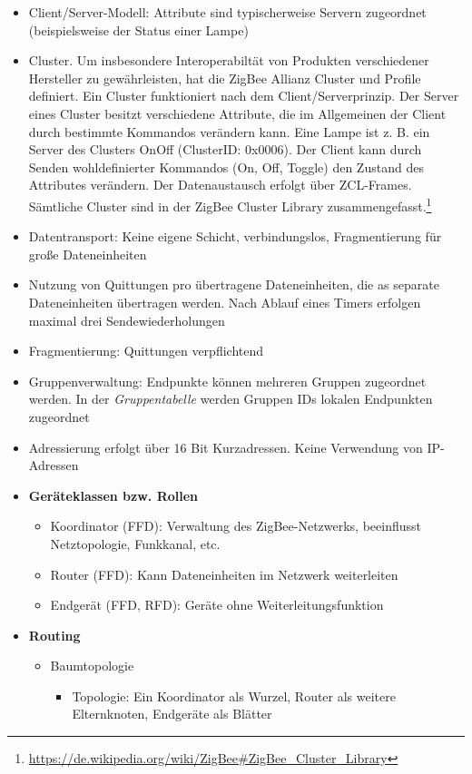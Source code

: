 \begin{itemize}
\begin{itemize}
	\end{itemize}
	\item Client/Server-Modell: Attribute sind typischerweise Servern zugeordnet (beispielsweise der Status einer Lampe)
	\item Cluster. Um insbesondere Interoperabiltät von Produkten verschiedener Hersteller zu gewährleisten, hat die ZigBee Allianz Cluster und Profile definiert. Ein Cluster funktioniert nach dem Client/Serverprinzip. Der Server eines Cluster besitzt verschiedene Attribute, die im Allgemeinen der Client durch bestimmte Kommandos verändern kann. Eine Lampe ist z. B. ein Server des Clusters OnOff (ClusterID: 0x0006). Der Client kann durch Senden wohldefinierter Kommandos (On, Off, Toggle) den Zustand des Attributes verändern. Der Datenaustausch erfolgt über ZCL-Frames. Sämtliche Cluster sind in der ZigBee Cluster Library zusammengefasst.\footnote{\url{https://de.wikipedia.org/wiki/ZigBee\#ZigBee_Cluster_Library}}
	\item Datentransport: Keine eigene Schicht, verbindungslos, Fragmentierung für große Dateneinheiten
	\item Nutzung von Quittungen pro übertragene Dateneinheiten, die as separate Dateneinheiten übertragen werden. Nach Ablauf eines Timers erfolgen maximal drei Sendewiederholungen
	\item Fragmentierung: Quittungen verpflichtend
	\item Gruppenverwaltung: Endpunkte können mehreren Gruppen zugeordnet werden. In der \textit{Gruppentabelle} werden Gruppen IDs lokalen Endpunkten zugeordnet
	\item Adressierung erfolgt über 16 Bit Kurzadressen. Keine Verwendung von IP-Adressen
	\item \textbf{Geräteklassen bzw. Rollen}
	\begin{itemize}
		\item Koordinator (FFD): Verwaltung des ZigBee-Netzwerks, beeinflusst Netztopologie, Funkkanal, etc.
		\item Router (FFD): Kann Dateneinheiten im Netzwerk weiterleiten
		\item Endgerät (FFD, RFD): Geräte ohne Weiterleitungsfunktion
	\end{itemize}
	\item \textbf{Routing}
	\begin{itemize}
		\item Baumtopologie
		\begin{itemize}
			\item Topologie: Ein Koordinator als Wurzel, Router als weitere Elternknoten, Endgeräte als Blätter

\end{itemize}
\end{itemize}
\end{itemize}
